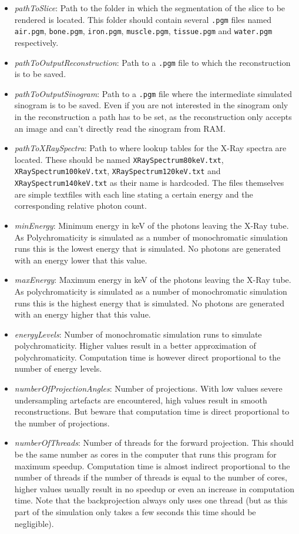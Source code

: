 \begin{itemize}
	\item\emph{pathToSlice}: Path to the folder in which the segmentation of the slice to be rendered is located. This folder should contain several \verb!.pgm! files named \verb!air.pgm!, \verb!bone.pgm!, \verb!iron.pgm!, \verb!muscle.pgm!, \verb!tissue.pgm! and \verb!water.pgm! respectively.
	\item\emph{pathToOutputReconstruction}: Path to a \verb!.pgm! file to which the reconstruction is to be saved.
	\item\emph{pathToOutputSinogram}: Path to a \verb!.pgm! file where the intermediate simulated sinogram is to be saved. Even if you are not interested in the sinogram only in the reconstruction a path has to be set, as the reconstruction only accepts an image and can't directly read the sinogram from RAM.
	\item\emph{pathToXRaySpectra}: Path to where lookup tables for the X-Ray spectra are located. These should be named \verb!XRaySpectrum80keV.txt!, \verb!XRaySpectrum100keV.txt!, \verb!XRaySpectrum120keV.txt! and \verb!XRaySpectrum140keV.txt! as their name is hardcoded. The files themselves are simple textfiles with each line stating a certain energy and the corresponding relative photon count.
	\item\emph{minEnergy}: Minimum energy in keV of the photons leaving the X-Ray tube. As Polychromaticity is simulated as a number of monochromatic simulation runs this is the lowest energy that is simulated. No photons are generated with an energy lower that this value.
	\item\emph{maxEnergy}: Maximum energy in keV of the photons leaving the X-Ray tube. As polychromaticity is simulated as a number of monochromatic simulation runs this is the highest energy that is simulated. No photons are generated with an energy higher that this value.
	\item\emph{energyLevels}: Number of monochromatic simulation runs to simulate polychromaticity. Higher values result in a better approximation of polychromaticity. Computation time is however direct proportional to the number of energy levels.
	\item\emph{numberOfProjectionAngles}: Number of projections. With low values severe undersampling artefacts are encountered, high values result in smooth reconstructions. But beware that computation time is direct proportional to the number of projections.
	\item\emph{numberOfThreads}: Number of threads for the forward projection. This should be the same number as cores in the computer that runs this program for maximum speedup. Computation time is almost indirect proportional to the number of threads if the number of threads is equal to the number of cores, higher values usually result in no speedup or even an increase in computation time. Note that the backprojection always only uses one thread (but as this part of the simulation only takes a few seconds this time should be negligible).

\end{itemize}
